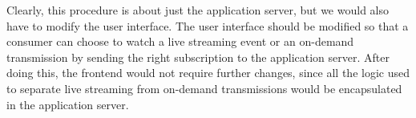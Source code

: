 Clearly, this procedure is about just the application server, but we would also
have to modify the user interface.
The user interface should be modified so that a consumer can choose to watch a
live streaming event or an on-demand transmission by sending the right
subscription to the application server.
After doing this, the frontend would not require further changes, since all the
logic used to separate live streaming from on-demand transmissions would be
encapsulated in the application server.
